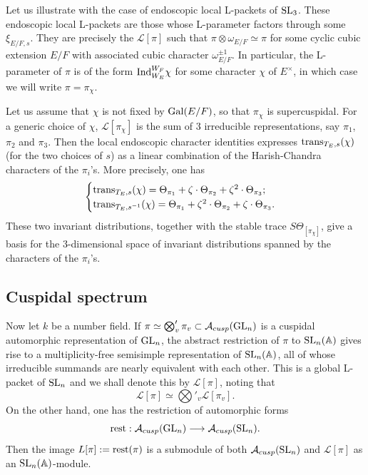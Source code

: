 \documentclass[11pt]{amsart}
\theoremstyle{plain}
\numberwithin{equation}{section}
\newcommand{\A}{\mathbb A}
\def\SL{{\rm SL}}
\def\GL{{\rm GL}}
\def\A{{\mathbb A}}
\begin{document}
Let us illustrate with the case of endoscopic local L-packets of $\SL_3$.
These endoscopic local L-packets are those whose L-parameter factors through some $\xi_{E/F,s}$.
They are precisely the $\mathcal{L}[\pi]$ such that $\pi \otimes \omega_{E/F} \simeq \pi$ for some cyclic cubic extension $E/F$ with associated cubic character $\omega_{E/F}^{\pm 1}$. In particular, the L-parameter of $\pi$ is of the form ${\rm Ind}_{W_E}^{W_F} \chi$ for some character $\chi$ of $E^{\times}$, in which case we will write $\pi =\pi_{\chi}$. 
\vskip 5pt

Let us assume that $\chi$ is not fixed by  ${\rm Gal}(E/F)$, so that $\pi_{\chi}$ is supercuspidal.  For a generic choice of $\chi$,    $\mathcal{L}[\pi_{\chi}]$ is the sum of 3 irreducible representations, say $\pi_1$, $\pi_2$ and $\pi_3$.
 Then the local endoscopic character identities expresses ${\rm trans}_{T_E,s}(\chi)$ (for the two choices of $s$) as a linear combination of the Harish-Chandra characters of the $\pi_i$'s. More precisely, one has
 \[ \begin{cases}
  {\rm trans}_{T_E,s}(\chi) = \Theta_{\pi_1} + \zeta \cdot \Theta_{\pi_2} + \zeta^2 \cdot  \Theta_{\pi_3};    \\
  {\rm trans}_{T_E,s^{-1}}(\chi) = \Theta_{\pi_1} + \zeta^2 \cdot \Theta_{\pi_2} + \zeta \cdot  \Theta_{\pi_3}.     
  \end{cases} \]
 These two invariant distributions, together with the stable trace $S\Theta_{[\pi_{\chi}]}$, give a basis for the 3-dimensional space of invariant distributions spanned by the characters of the $\pi_i$'s.
\vskip 5pt

 \subsection{\bf Cuspidal spectrum} \label{SS:cuspidal}
Now let $k$ be a number field. If $\pi \simeq \bigotimes'_v\pi_v\subset \mathcal{A}_{cusp}(\GL_n)$ is a cuspidal automorphic representation of $\GL_n$,  
the abstract restriction of $\pi$ to $\SL_n(\A)$ gives rise to a multiplicity-free semisimple representation of $\SL_n(\A)$, all of whose irreducible summands are nearly equivalent with each other. This is a global L-packet of $\SL_n$ and we shall denote this by $\mathcal{L}[\pi]$, noting that
\[  \mathcal{L}[\pi]  \simeq \bigotimes'_v \mathcal{L}[\pi_v]. \]
 On the other hand, one has the restriction of automorphic forms
\[ {\rm rest}: \mathcal{A}_{cusp}(\GL_n) \longrightarrow \mathcal{A}_{cusp}(\SL_n). \]
Then the image $L[\pi] := {\rm rest}(\pi)$ is a  submodule of both $\mathcal{A}_{cusp}(\SL_n)$ and $\mathcal{L}[\pi]$ as an $\SL_n(\A)$-module. 
\vskip 5pt
\end{document}

